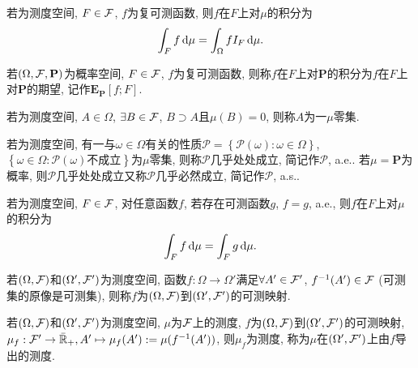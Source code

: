 \begin{definition}
    若\s{}为测度空间, $F\in\mathcal{F}$, $f$为复可测函数, 则$f$在$F$上对$\mu$的积分为
    \begin{equation}
        \int_{F}f\,\mathrm{d}\mu=\int_{\Omega}fI_F\,\mathrm{d}\mu.
    \end{equation}
\end{definition}

\begin{definition}
    若$(\Omega,\mathcal{F},\mathbf{P})$为概率空间, $F\in\mathcal{F}$, $f$为复可测函数, 则称$f$在$F$上对$\mathbf{P}$的积分为$f$在$F$上对$\mathbf{P}$的期望, 记作$\mathbf{E}_{\mathbf{P}}[f;F]$.
\end{definition}

\begin{definition}
    若\s{}为测度空间, $A\in\Omega$, $\exists  B\in\mathcal{F}$, $B\supset A$且$\mu(B)=0$, 则称$A$为一$\mu$零集.
\end{definition}

\begin{definition}
    若\s{}为测度空间, 有一与$\omega\in\Omega$有关的性质$\mathscr{P}=\left\{\mathscr{P}(\omega):\omega\in\Omega\right\}$, $\left\{\omega\in\Omega:\mathscr{P}(\omega)\text{不成立}\right\}$为$\mu$零集, 则称$\mathscr{P}$几乎处处成立, 简记作$\mathscr{P}$, a.e.. 若$\mu=\mathbf{P}$为概率, 则$\mathscr{P}$几乎处处成立又称$\mathscr{P}$几乎必然成立, 简记作$\mathscr{P}$, a.s..
\end{definition}

\begin{definition}
    若\s{}为测度空间, $F\in\mathcal{F}$, 对任意函数$f$, 若存在可测函数$g$, $f=g$, a.e., 则$f$在$F$上对$\mu$的积分为
    \begin{equation}
        \int_{F}f\,\mathrm{d}\mu=\int_{F}g\,\mathrm{d}\mu.
    \end{equation}
\end{definition}

\begin{definition}
    若$(\Omega,\mathcal{F})$和$(\Omega',\mathcal{F}')$为测度空间, 函数$f:\Omega\to\Omega'$满足$\forall A' \in \mathcal{F}'$, $f^{-1}(A')\in\mathcal{F}$ (可测集的原像是可测集), 则称$f$为$(\Omega,\mathcal{F})$到$(\Omega',\mathcal{F}')$的可测映射.
\end{definition}

\begin{definition}
    若$(\Omega,\mathcal{F})$和$(\Omega',\mathcal{F}')$为测度空间, $\mu$为$\mathcal{F}$上的测度, $f$为$(\Omega,\mathcal{F})$到$(\Omega',\mathcal{F}')$的可测映射, $\mu_f:\mathcal{F}'\to \bar{\mathbb{R}}_+,A'\mapsto\mu_f(A'):=\mu(f^{-1}(A'))$, 则$\mu_f$为测度, 称为$\mu$在$(\Omega',\mathcal{F}')$上由$f$导出的测度.
\end{definition}

